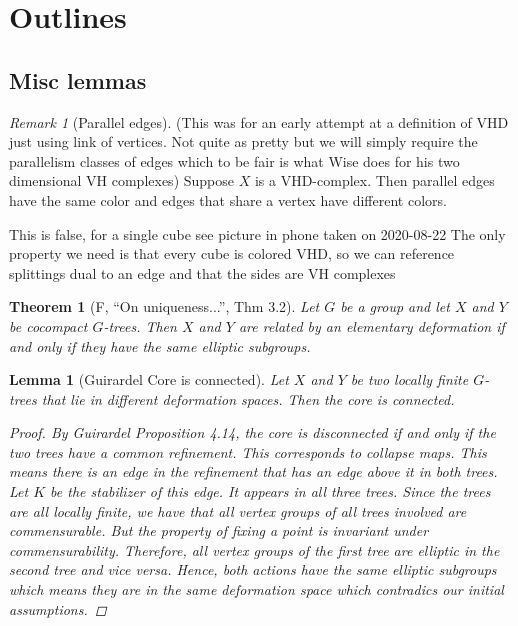 \documentclass{article}
\theoremstyle{mystyle}
\newtheorem{thm}{Theorem}[section]
\newtheorem{lem}{Lemma}[section]
\theoremstyle{remark}
\newtheorem{rmk}{Remark}[section]
\begin{document}
\section{Outlines}

\subsection{Misc lemmas}

\begin{rmk}
    [Parallel edges]
    (This was for an early attempt at a definition of VHD just using link of vertices. Not quite as pretty but we will simply require the parallelism classes of edges which to be fair is what Wise does for his two dimensional VH complexes)
    Suppose \(X\) is a VHD-complex. Then parallel edges have the same color and edges that share a vertex have different colors.

    This is false, for a single cube see picture in phone taken on 2020-08-22
    The only property we need is that every cube is colored VHD, so we can reference splittings dual to an edge and that the sides are VH complexes
\end{rmk}

\begin{thm}[F, ``On uniqueness...'', Thm 3.2]
\label{thm:forester}
Let $G$ be a group and let $X$ and $Y$ be cocompact $G$-trees. Then $X$ and $Y$ are related by an elementary deformation if and only if they have the same elliptic subgroups.
\end{thm}

\begin{lem}
    [Guirardel Core is connected]
    \label{lem:coreconnected} 
    Let \(X\) and \(Y\) be two locally finite \(G\)-trees that lie in different deformation spaces. Then the core is connected.
    \begin{proof}
        By Guirardel Proposition 4.14, the core is disconnected if and only if the two trees have a common refinement. This corresponds to collapse maps. This means there is an edge in the refinement that has an edge above it in both trees. Let \(K\) be the stabilizer of this edge. It appears in all three trees. Since the trees are all locally finite, we have that all vertex groups of all trees involved are commensurable. But the property of fixing a point is invariant under commensurability. Therefore, all vertex groups of the first tree are elliptic in the second tree and vice versa. Hence, both actions have the same elliptic subgroups which means they are in the same deformation space which contradics our initial assumptions.
    \end{proof}
\end{lem}
\end{document}
